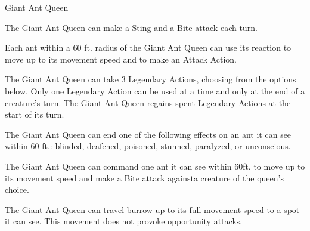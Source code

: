 \documentclass[letterpaper,openany,twoside,twocolumn]{book}
\begin{document}
\begin{DndMonster}[float*=b, width=\textwidth +8pt]{Giant Ant Queen}
\begin{multicols}{2}
	The Giant Ant Queen can make a Sting and a Bite attack each turn.
	
	\DndMonsterAttack[
      name=Bite,
      distance=melee, %
      mod=+11,
      reach=10,
      targets=one target,
      dmg=\DndDice{4d10 + 7},
      dmg-type=piercing,
      extra={. The target must make a DC 18 Constitution Saving throw, taking \DndDice{2d6} poison damage on a failed save, or half as much on a successful one},
    ]
    
    \DndMonsterAttack[
      name=Sting,
      distance=melee, %
      mod=+11,
      reach=10,
      targets=one target,
      dmg=\DndDice{4d4 + 7},
      dmg-type=piercing,
      extra={. The target must make a DC 18 Constitution Saving throw, taking \DndDice{8d6} poison damage on a failed save, or half as much on a successful one},
    ]
    
	Each ant within a 60 ft. radius of the Giant Ant Queen can use its reaction to move up to its movement speed and to make an Attack Action.
    
    The Giant Ant Queen can take 3 Legendary Actions, choosing from the options below. Only one Legendary Action can be used at a time and only at the end of a creature's turn. The Giant Ant Queen regains spent Legendary Actions at the start of its turn.
    
    The Giant Ant Queen can end one of the following effects on an ant it can see within 60 ft.: blinded, deafened, poisoned, stunned, paralyzed, or unconscious.
    
    The Giant Ant Queen can command one ant it can see within 60ft. to move up to its movement speed and make a Bite attack againsta creature of the queen's choice.
    
    The Giant Ant Queen can travel burrow up to its full movement speed to a spot it can see. This movement does not provoke opportunity attacks.
      
\end{multicols}\end{DndMonster}
\end{document}
